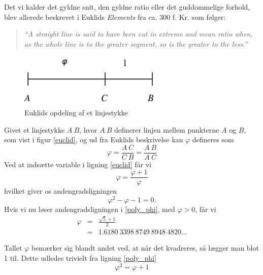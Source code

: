 {
Det vi kalder det gyldne snit, den gyldne ratio eller det guddommelige
forhold, blev allerede beskrevet i Euklids \emph{Elements} fra ca. 300
f.  Kr. som følger:
\begin{quote}
	\emph{``A straight line is said to have been cut in extreme
	and mean ratio when, as the whole line is to the greater
	segment, so is the greater to the less.''}\cite{heath1908thirteen}
\end{quote}

\begin{figure}[h!]
	\begin{center}
		\includegraphics[scale=0.49,angle=0]{afsnit/baggrund/billeder/line_segment_a_c_b}
	\end{center}
	\caption{Euklids opdeling af et linjestykke}
	\label{line_segment}
\end{figure}

Givet et linjestykke $A\ B$, hvor $A\ B$ definerer linjen mellem
punkterne $A$ og $B$, som vist i figur \ref{euclid}, og ud fra Euklids
beskrivelse kan $\varphi$ defineres som
\begin{equation}
	\varphi	= \frac{A\ C}{C\ B} = \frac{A\ B}{A\ C}
	\label{euclid}
\end{equation}
Ved at indsætte variable i ligning \ref{euclid} får vi
\begin{equation}
	\varphi = \frac{\varphi + 1}{\varphi}
	\label{expand_euclid}
\end{equation}
hvilket giver os andengradsligningen
\begin{equation}
	\varphi^{2} - \varphi - 1 = 0.
	\label{poly_phi}
\end{equation}
Hvis vi nu løser andengradsligningen i \ref{poly_phi}, med
$\varphi > 0$, får vi
\begin{eqnarray*}
	\varphi	& =	& \frac{\sqrt{5} + 1}{2} \\
		& =	& 1.6180\ 3398\ 8749\ 8948\ 4820 \dots
\end{eqnarray*}

Tallet $\varphi$ bemærker sig blandt andet ved, at når det kvadreres, så
lægger man blot 1 til. Dette udledes trivielt fra ligning \ref{poly_phi}
\begin{equation}
	\varphi^{2} = \varphi + 1
	\label{phi_squared}
\end{equation}

}
